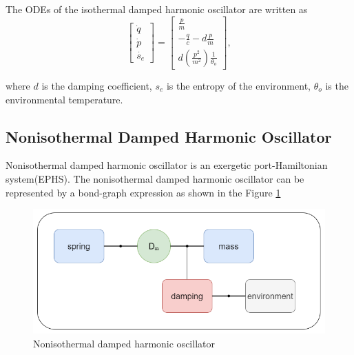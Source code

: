 The ODEs of the isothermal damped harmonic oscillator are written as
\begin{equation}
    \label{eq:ODE_isothermal_damped_harmonic_oscillator}
    \begin{bmatrix}
    \dot{q}\\
    \dot{p}\\
    \dot{s_{e}}
    \end{bmatrix}
    =
    \begin{bmatrix}
    \frac{p}{m}\\
    -\frac{q}{c}-d\frac{p}{m}\\
    d(\frac{p^2}{m^2})\frac{1}{\theta_{o}}
    \end{bmatrix},
\end{equation}

where $d$ is the damping coefficient, $s_{e}$ is the entropy of the environment, $\theta_{o}$ is the environmental temperature.


\subsection{Nonisothermal Damped Harmonic Oscillator}
Nonisothermal damped harmonic oscillator is an exergetic port-Hamiltonian system(EPHS). The nonisothermal damped harmonic oscillator can be represented by a bond-graph expression as shown in the Figure \ref{fig:nonisothermal_damped_harmonic_oscillator}

\begin{figure}[h!]
    \centering
    \includegraphics[scale=0.5]{figures/1_Physical_Model/3_nonisothermal_damped_harmonic_oscillator.png}
    \caption{Nonisothermal damped harmonic oscillator}
    \label{fig:nonisothermal_damped_harmonic_oscillator}
\end{figure}

